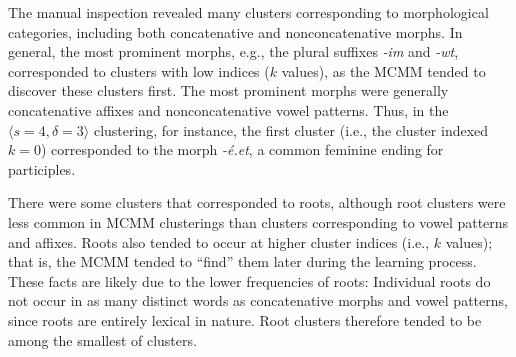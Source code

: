The manual inspection revealed many clusters corresponding to morphological categories, including 
both concatenative and nonconcatenative morphs. In general, the most prominent morphs, e.g., the plural
suffixes \textit{-im}
and \textit{-wt}, corresponded to clusters with low indices ($k$ values), as the MCMM tended to discover these clusters first. The most 
prominent morphs were generally concatenative affixes and nonconcatenative vowel patterns. Thus, in the 
$\langle{s}=4,\delta=3\rangle$ clustering, for instance, the first cluster (i.e., the cluster indexed $k = 0$) corresponded to the morph \textit{-\'{e}.et},
a common feminine ending for participles.

There were some clusters that corresponded to roots, although root clusters were less common in MCMM clusterings
than clusters corresponding to vowel patterns and affixes. 
Roots also tended to occur at higher cluster indices (i.e., $k$ values); that is, the 
MCMM tended to ``find'' them later during the learning process. 
These facts are likely due to the lower frequencies of roots: Individual roots do not occur in as many distinct words
as concatenative morphs and vowel patterns, since roots are entirely lexical in nature. 
Root clusters therefore tended to be among the smallest of clusters.

